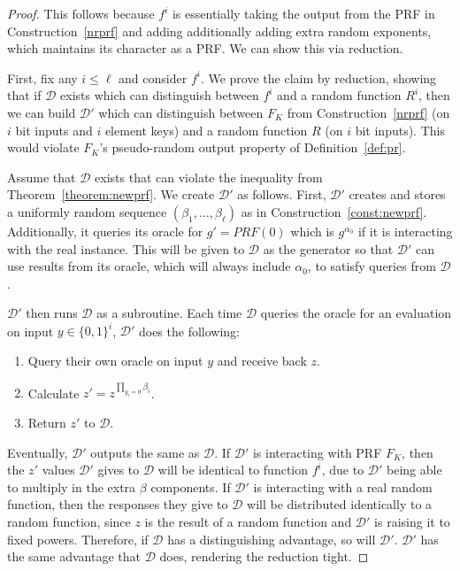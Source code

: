 \begin{proof}
This follows because $f^i$ is essentially taking the output from the
PRF in Construction~\ref{nrprf} and adding additionally adding extra
random exponents, which maintains its character as a PRF. We can show
this via reduction.

First, fix any $i\leq\ell$ and consider $f^i$.  We prove the claim by
reduction, showing that if $\mathcal{D}$ exists which can distinguish
between $f^i$ and a random function $R^i$, then we can build
$\mathcal{D}'$ which can distinguish between $F_K$ from
Construction~\ref{nrprf} (on $i$ bit inputs and $i$ element keys) and
a random function $R$ (on $i$ bit inputs). This would violate $F_K$'s
pseudo-random output property of Definition~\ref{def:pr}.

Assume that $\mathcal{D}$ exists that can violate the inequality from
Theorem~\ref{theorem:newprf}.  We create $\mathcal{D'}$ as follows.
First, $\mathcal{D}'$ creates and stores a uniformly random sequence
$(\beta_1,\ldots,\beta_\ell)$ as in Construction~\ref{const:newprf}.
Additionally, it queries its oracle for $g' = PRF(0)$ which is
$g^{\alpha_0}$ if it is interacting with the real instance.  This will
be given to $\mathcal{D}$ as the generator so that $\mathcal{D}'$ can
use results from its oracle, which will always include $\alpha_0$, to
satisfy queries from $\mathcal{D}$.

$\mathcal{D}'$ then runs $\mathcal{D}$ as a subroutine.  Each time
$\mathcal{D}$ queries the oracle for an evaluation on input
$y\in\{0,1\}^i$, $\mathcal{D}'$ does the following: 
\begin{enumerate}
\item Query their own oracle on input $y$ and receive back $z$.
\item Calculate $z' = z^{\prod_{y_i = 0} \beta_i}$.
\item Return $z'$ to $\mathcal{D}$.
\end{enumerate}

Eventually, $\mathcal{D}'$ outputs the same as $\mathcal{D}$.  If
$\mathcal{D}'$ is interacting with PRF $F_K$, then the $z'$ values
$\mathcal{D}'$ gives to $\mathcal{D}$ will be identical to function
$f^i$, due to $\mathcal{D}'$ being able to multiply in the extra
$\beta$ components.  If $\mathcal{D}'$ is interacting with a real
random function, then the responses they give to $\mathcal{D}$ will be
distributed identically to a random function, since $z$ is the result
of a random function and $\mathcal{D}'$ is raising it to fixed powers.
Therefore, if $\mathcal{D}$ has a distinguishing advantage, so will
$\mathcal{D}'$.  $\mathcal{D}'$ has the same advantage that
$\mathcal{D}$ does, rendering the reduction tight.
\end{proof}

